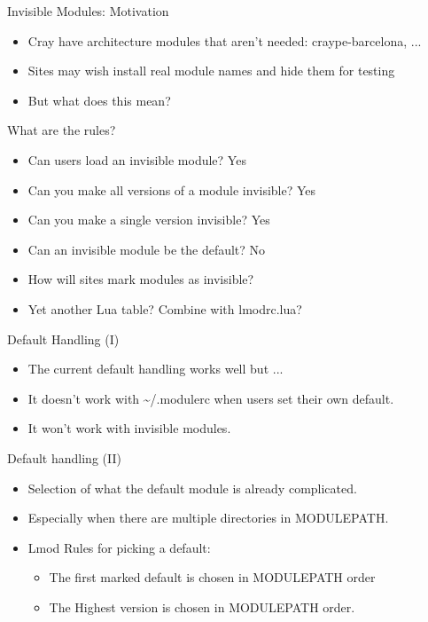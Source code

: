 \documentclass{beamer}
\begin{document}
\begin{frame}{Invisible Modules: Motivation}
  \begin{itemize}
    \item Cray have architecture modules that aren't needed:
      craype-barcelona, ...
    \item Sites may wish install real module names and hide them for
      testing
    \item But what does this mean?
  \end{itemize}
\end{frame}

\begin{frame}{What are the rules?}
  \begin{itemize}
    \item Can users load an invisible module? Yes
    \item Can you make all versions of a module invisible?  Yes
    \item Can you make a single version invisible? Yes
    \item Can an invisible module be the default?  No
    \item How will sites mark modules as invisible?
    \item Yet another Lua table? Combine with lmodrc.lua?
  \end{itemize}
\end{frame}

\begin{frame}{Default Handling (I)}
  \begin{itemize}
    \item The current default handling works well but ...
    \item It doesn't work with \textasciitilde/.modulerc when users set their own
      default.
    \item It won't work with invisible modules.
  \end{itemize}
\end{frame}



\begin{frame}{Default handling (II)}
  \begin{itemize}
    \item Selection of what the default module is already complicated.
    \item Especially when there are multiple directories in MODULEPATH.
    \item Lmod Rules for picking a default:
      \begin{itemize}
        \item The first marked default is chosen in MODULEPATH order
        \item The Highest version is chosen in MODULEPATH order.
      \end{itemize}
  \end{itemize}
\end{frame}
\end{document}
